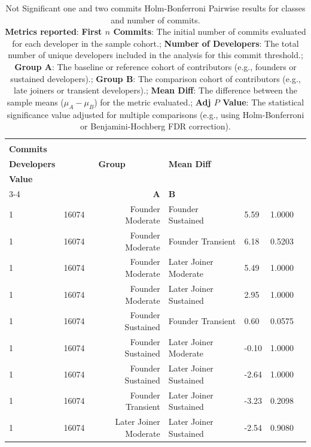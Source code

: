 \begin{table}[H]
\centering
\setlength{\tabcolsep}{2pt}
\caption[Not Significant Holm-Bonferroni Pairwise one and two commits results classes]{Not Significant one and two commits Holm-Bonferroni Pairwise results for classes and number of commits. \\ \textbf{Metrics reported}:   \textbf{First $n$ Commits}: The initial number of commits evaluated for each developer in the sample cohort.;  \textbf{Number of Developers}: The total number of unique developers included in the analysis for this commit threshold.;  \textbf{Group A}: The baseline or reference cohort of contributors (e.g., founders or sustained developers).;  \textbf{Group B}: The comparison cohort of contributors (e.g., late joiners or transient developers).;  \textbf{Mean Diff}: The difference between the sample means ($\mu_A - \mu_B$) for the metric evaluated.;  \textbf{Adj $P$ Value}: The statistical significance value adjusted for multiple comparisons (e.g., using Holm-Bonferroni or Benjamini-Hochberg FDR correction).
}
\begin{tabular}{l r r l l r r}
\toprule
\makecell[t]{\textbf{First $n$}\\\textbf{Commits}} & \makecell[t]{\textbf{Number of}\\\textbf{Developers}} & \multicolumn{2}{c}{\textbf{Group}} & \textbf{Mean Diff} & \makecell[t]{\textbf{Adj $P$}\\\textbf{Value}} \\ 
\cmidrule(lr){3-4}
 &  & \textbf{A} & \textbf{B} &  &  \\ 
\midrule
1 & 16074 & Founder Moderate & Founder Sustained & 5.59 & 1.0000 \\ 
1 & 16074 & Founder Moderate & Founder Transient & 6.18 & 0.5203 \\ 
1 & 16074 & Founder Moderate & Later Joiner Moderate & 5.49 & 1.0000 \\ 
1 & 16074 & Founder Moderate & Later Joiner Sustained & 2.95 & 1.0000 \\ 
1 & 16074 & Founder Sustained & Founder Transient & 0.60 & 0.0575 \\ 
1 & 16074 & Founder Sustained & Later Joiner Moderate & -0.10 & 1.0000 \\ 
1 & 16074 & Founder Sustained & Later Joiner Sustained & -2.64 & 1.0000 \\ 
1 & 16074 & Founder Transient & Later Joiner Sustained & -3.23 & 0.2098 \\ 
1 & 16074 & Later Joiner Moderate & Later Joiner Sustained & -2.54 & 0.9080 \\ 

\end{tabular}
\end{table}
